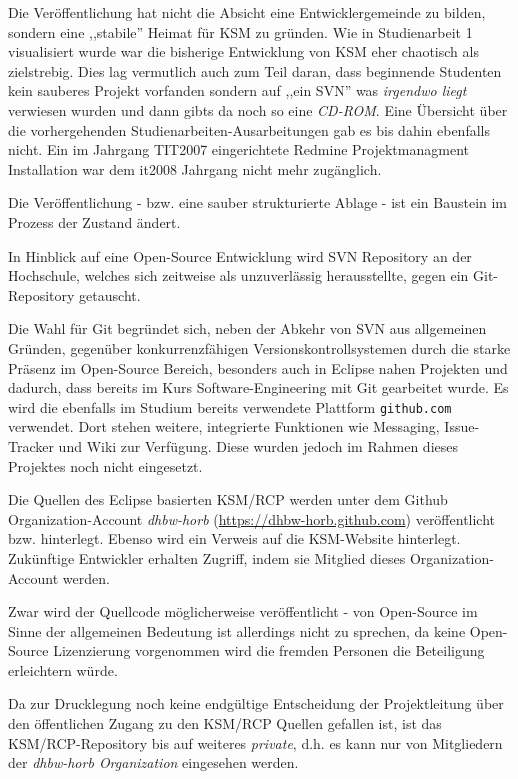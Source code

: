 \documentclass[%
12pt,titlepage,abstracton,DIV=10,BCOR=0.5cm]{scrreprt}
\begin{document}
Die Veröffentlichung hat nicht die Absicht eine Entwicklergemeinde zu bilden,
sondern eine ,,stabile'' Heimat für KSM zu gründen. Wie in Studienarbeit 1
visualisiert wurde \cite[S. 2]{fischer10} war die bisherige Entwicklung von KSM
eher chaotisch als zielstrebig. Dies lag vermutlich auch zum Teil daran, dass
beginnende Studenten kein sauberes Projekt vorfanden sondern auf ,,ein SVN'' was
\textit{irgendwo liegt} verwiesen wurden und dann gibts da noch so eine
\textit{CD-ROM}. Eine Übersicht über die vorhergehenden
Studienarbeiten-Ausarbeitungen gab es bis dahin ebenfalls nicht. Ein im Jahrgang
\textsc{TIT2007} eingerichtete Redmine Projektmanagment Installation war dem
it2008 Jahrgang nicht mehr zugänglich.

Die Veröffentlichung - bzw. eine sauber strukturierte Ablage - ist ein Baustein
im Prozess der Zustand ändert.

In Hinblick auf eine Open-Source Entwicklung wird SVN Repository an der
Hochschule, welches sich zeitweise als unzuverlässig herausstellte, gegen ein
Git-Repository getauscht.

Die Wahl für Git begründet sich, neben der Abkehr von SVN aus allgemeinen
Gründen, gegenüber konkurrenzfähigen Versionskontrollsystemen durch die
starke Präsenz im Open-Source Bereich, besonders auch in Eclipse nahen Projekten
und dadurch, dass bereits im Kurs Software-Engineering mit Git gearbeitet wurde.
Es wird die ebenfalls im Studium bereits verwendete Plattform
\texttt{github.com} verwendet. Dort stehen weitere, integrierte Funktionen wie
Messaging, Issue-Tracker und Wiki zur Verfügung. Diese wurden jedoch im Rahmen
dieses Projektes noch nicht eingesetzt.

Die Quellen des Eclipse basierten KSM/RCP werden unter dem Github
Organization-Account \textit{dhbw-horb}
({\small\url{https://dhbw-horb.github.com}}) veröffentlicht bzw. hinterlegt.
Ebenso wird ein Verweis auf die KSM-Website hinterlegt. Zukünftige Entwickler
erhalten Zugriff, indem sie Mitglied dieses Organization-Account werden.

Zwar wird der Quellcode möglicherweise veröffentlicht - von Open-Source im Sinne
der allgemeinen Bedeutung ist allerdings nicht zu sprechen, da keine Open-Source
Lizenzierung vorgenommen wird die fremden Personen die Beteiligung erleichtern
würde.

Da zur Drucklegung noch keine endgültige Entscheidung der Projektleitung über
den öffentlichen Zugang zu den KSM/RCP Quellen gefallen ist, ist das
KSM/RCP-Repository bis auf weiteres \textit{private}, d.h. es kann nur von
Mitgliedern der \textit{dhbw-horb Organization} eingesehen werden.
\end{document}
